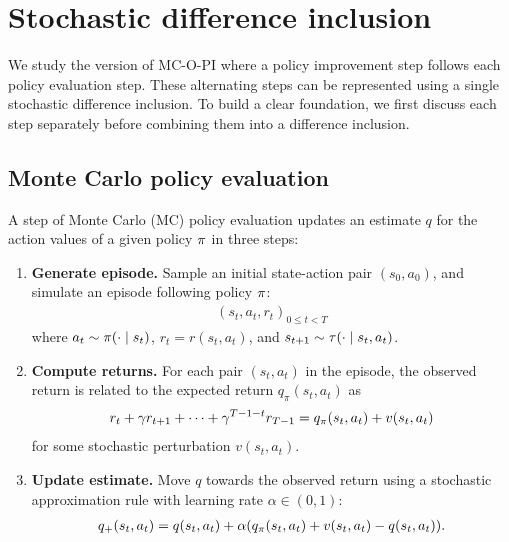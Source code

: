 \section{Stochastic difference inclusion}
\label{sec: diff inclusion}

We study the version of MC-O-PI where a policy improvement step follows each policy evaluation step.
These alternating steps can be represented using a single stochastic difference inclusion.
To build a clear foundation, we first discuss each step separately before combining them into a difference inclusion.





\subsection{Monte Carlo policy evaluation}

A step of Monte Carlo (MC) policy evaluation updates an estimate $q$ for the action values of a given policy $\pi$ in three steps:
\begin{enumerate}[label=\arabic*., font=\bfseries\sffamily]
    \item \textbf{\sffamily Generate episode.}
    Sample an initial state-action pair $(s_0, a_0)$, and simulate an episode following policy $\pi$:
    \begin{align*}
        (s_t, a_t, r_t)_{0 \leq t < T}
    \end{align*}
    where $a_t \sim \pi(\cdot \mid s_t)$, $r_{t} = r(s_t, a_t)$, and $s_{t+1} \sim \tau(\cdot \mid s_t, a_t)$.

    \item \textbf{\sffamily Compute returns.}
    For each pair $(s_t, a_t)$ in the episode, the observed return is related to the expected return $q_{\pi}(s_t,a_t)$ as
    \begin{align*}
        r_t + \gamma r_{t+1} + \dots + \gamma^{T-1-t} r_{T-1}
        =
        q_{\pi}(s_t,a_t) + v(s_t,a_t)
    \end{align*}
    for some stochastic perturbation $v(s_t, a_t)$.

    \item \textbf{\sffamily Update estimate.}
    Move $q$ towards the observed return using a stochastic approximation rule with learning rate $\alpha \in (0,1)$:
    \begin{align*}
        q_+(s_t, a_t) = q(s_t, a_t) + \alpha ( q_{\pi}(s_t,a_t) + v(s_t,a_t) - q(s_t, a_t) ) .
    \end{align*}
    
\end{enumerate}


